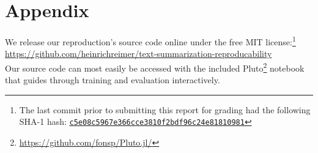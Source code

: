 \appendix
\section{Appendix} %

We release our reproduction's source code online under the free MIT license:\footnote{The last commit prior to submitting this report for grading had the following SHA-1 hash: \href{https://github.com/heinrichreimer/text-summarization-reproducability/commit/c5e08c5967e366cce3810f2bdf96c24e81810981}{\texttt{c5e08c5967e366cce3810f2bdf96c24e81810981}}}\\
\url{https://github.com/heinrichreimer/text-summarization-reproducability}\\
Our source code can most easily be accessed with the included Pluto\footnote{\url{https://github.com/fonsp/Pluto.jl/}} notebook that guides through training and evaluation interactively.
